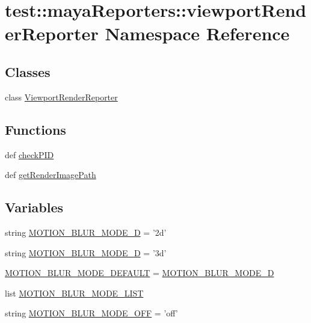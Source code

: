 \hypertarget{namespacetest_1_1mayaReporters_1_1viewportRenderReporter}{\section{test\-:\-:maya\-Reporters\-:\-:viewport\-Render\-Reporter \-Namespace \-Reference}
\label{d6/dc9/namespacetest_1_1mayaReporters_1_1viewportRenderReporter}
}
\subsection*{\-Classes}
\begin{DoxyCompactItemize}
\item 
class \hyperlink{classtest_1_1mayaReporters_1_1viewportRenderReporter_1_1ViewportRenderReporter}{\-Viewport\-Render\-Reporter}
\end{DoxyCompactItemize}
\subsection*{\-Functions}
\begin{DoxyCompactItemize}
\item 
def \hyperlink{namespacetest_1_1mayaReporters_1_1viewportRenderReporter_ae26af34152ed08c297da2b5f8b8030fa}{check\-P\-I\-D}
\item 
def \hyperlink{namespacetest_1_1mayaReporters_1_1viewportRenderReporter_a4bd609e58318d94dd18a8a108eda7a14}{get\-Render\-Image\-Path}
\end{DoxyCompactItemize}
\subsection*{\-Variables}
\begin{DoxyCompactItemize}
\item 
string \hyperlink{namespacetest_1_1mayaReporters_1_1viewportRenderReporter_a78d573bb4564dc0167c41ea85391ae22}{\-M\-O\-T\-I\-O\-N\-\_\-\-B\-L\-U\-R\-\_\-\-M\-O\-D\-E\-\_\-D} = '2d'
\item 
string \hyperlink{namespacetest_1_1mayaReporters_1_1viewportRenderReporter_ae93d9eacc837aae4541a29c4856f5d93}{\-M\-O\-T\-I\-O\-N\-\_\-\-B\-L\-U\-R\-\_\-\-M\-O\-D\-E\-\_\-D} = '3d'
\item 
\hyperlink{namespacetest_1_1mayaReporters_1_1viewportRenderReporter_ab7fcb9ba8d94a060acf1fc818ec9f229}{\-M\-O\-T\-I\-O\-N\-\_\-\-B\-L\-U\-R\-\_\-\-M\-O\-D\-E\-\_\-\-D\-E\-F\-A\-U\-L\-T} = \hyperlink{namespacetest_1_1mayaReporters_1_1viewportRenderReporter_ae93d9eacc837aae4541a29c4856f5d93}{\-M\-O\-T\-I\-O\-N\-\_\-\-B\-L\-U\-R\-\_\-\-M\-O\-D\-E\-\_\-D}
\item 
list \hyperlink{namespacetest_1_1mayaReporters_1_1viewportRenderReporter_ace0ac58074cd08235a9ac2e57edb2239}{\-M\-O\-T\-I\-O\-N\-\_\-\-B\-L\-U\-R\-\_\-\-M\-O\-D\-E\-\_\-\-L\-I\-S\-T}
\item 
string \hyperlink{namespacetest_1_1mayaReporters_1_1viewportRenderReporter_a67c77344e314e2cc33604b87c60be526}{\-M\-O\-T\-I\-O\-N\-\_\-\-B\-L\-U\-R\-\_\-\-M\-O\-D\-E\-\_\-\-O\-F\-F} = 'off'
\end{DoxyCompactItemize}


